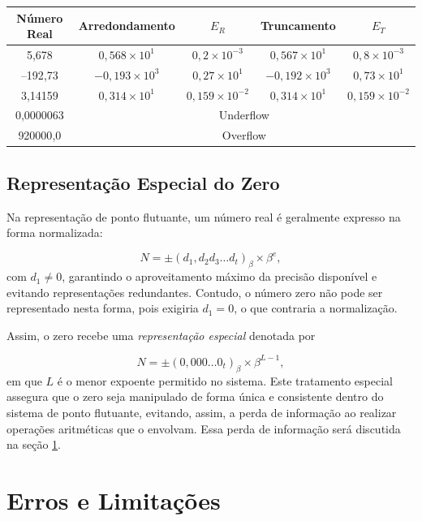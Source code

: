 \begin{center}
\small
\begin{tabular}{|c|c|c|c|c|}
\hline
\textbf{Número Real} & \textbf{Arredondamento} & \textbf{\(E_R\)}  & \textbf{Truncamento} & \textbf{\(E_T\)}  \\
\hline
5{,}678 & \( 0{,}568 \times 10^1 \) & \( 0{,}2 \times 10^{-3} \) & \( 0{,}567 \times 10^1 \) & \( 0{,}8 \times 10^{-3} \) \\
\hline
–192{,}73 & \( -0{,}193 \times 10^3 \) & \( 0{,}27 \times 10^{1} \) & \( -0{,}192 \times 10^3 \) & \( 0{,}73 \times 10^{1} \) \\
\hline
3{,}14159 & \( 0{,}314 \times 10^1 \) & \( 0{,}159 \times 10^{-2} \) & \( 0{,}314 \times 10^1 \) & \( 0{,}159 \times 10^{-2} \) \\
\hline
0{,}0000063 & \multicolumn{4}{c|}{Underflow} \\
\hline
920000{,}0 & \multicolumn{4}{c|}{Overflow} \\
\hline
\end{tabular}
\end{center}


\subsection{Representação Especial do Zero}

Na representação de ponto flutuante, um número real é geralmente expresso na forma normalizada:

\[
N = \pm (d_1{,}d_2 d_3 \ldots d_t)_\beta \times \beta^{e},
\]
com \( d_1 \neq 0 \), garantindo o aproveitamento máximo da precisão disponível e evitando representações redundantes. Contudo, o número zero não pode ser representado nesta forma, pois exigiria \( d_1 = 0 \), o que contraria a normalização. 

Assim, o zero recebe uma \textit{representação especial} denotada por

\[
N = \pm (0{,}000\ldots 0_{t})_\beta \times \beta^{L - 1},
\]
em que \( L \) é o menor expoente permitido no sistema. Este tratamento especial assegura que o zero seja manipulado de forma única e consistente dentro do sistema de ponto flutuante, evitando, assim, a perda de informação ao realizar operações aritméticas que o envolvam. Essa perda de informação será discutida na seção \ref{subsec:erroselim}.



\section{Erros e Limitações}
\label{subsec:erroselim}

